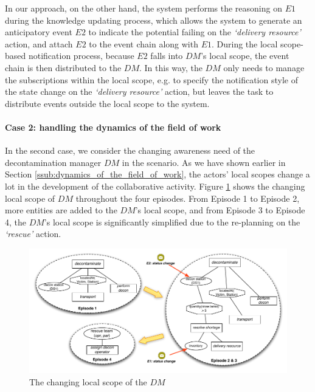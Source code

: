 In our approach, on the other hand, the system performs the reasoning on $E1$ during the knowledge updating process, which allows the system to generate an anticipatory event $E2$ to indicate the potential failing on the \emph{`delivery resource'} action, and attach $E2$ to the event chain along with $E1$. During the local scope-based notification process, because $E2$ falls into $DM$'s local scope, the event chain is then distributed to the $DM$. In this way, the $DM$ only needs to manage the subscriptions within the local scope, e.g. to specify the notification style of the state change on the \emph{`delivery resource'} action, but leaves the task to distribute events outside the local scope to the system.

\paragraph*{Case 2: handling the dynamics of the field of work} %
\label{par:case_2_handling_the_dynamics_of_the_field_of_work}
In the second case, we consider the changing awareness need of the decontamination manager $DM$ in the scenario. As we have shown earlier in Section \ref{ssub:dynamics_of_the_field_of_work}, the actors' local scopes change a lot in the development of the collaborative activity. Figure \ref{fig:case_2_dm} shows the changing local scope of $DM$ throughout the four episodes. From Episode 1 to Episode 2, more entities are added to the $DM$'s local scope, and from Episode 3 to Episode 4, the $DM$'s local scope is significantly simplified due to the re-planning on the \emph{`rescue'} action.

\begin{figure}[htbp] %
	\centering
	\includegraphics[width=5.8in]{case_2_dm.pdf} 
	\caption{The changing local scope of the $DM$}
	\label{fig:case_2_dm}
\end{figure}

